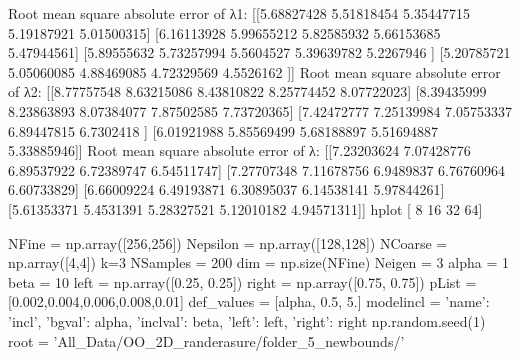 Root mean square absolute error of λ1:
 [[5.68827428 5.51818454 5.35447715 5.19187921 5.01500315]
 [6.16113928 5.99655212 5.82585932 5.66153685 5.47944561]
 [5.89555632 5.73257994 5.5604527  5.39639782 5.2267946 ]
 [5.20785721 5.05060085 4.88469085 4.72329569 4.5526162 ]]
Root mean square absolute error of λ2: 
 [[8.77757548 8.63215086 8.43810822 8.25774452 8.07722023]
 [8.39435999 8.23863893 8.07384077 7.87502585 7.73720365]
 [7.42472777 7.25139984 7.05753337 6.89447815 6.7302418 ]
 [6.01921988 5.85569499 5.68188897 5.51694887 5.33885946]]
Root mean square absolute error of λ: 
 [[7.23203624 7.07428776 6.89537922 6.72389747 6.54511747]
 [7.27707348 7.11678756 6.9489837  6.76760964 6.60733829]
 [6.66009224 6.49193871 6.30895037 6.14538141 5.97844261]
 [5.61353371 5.4531391  5.28327521 5.12010182 4.94571311]]
hplot [ 8 16 32 64]

NFine = np.array([256,256])
Nepsilon = np.array([128,128])
NCoarse = np.array([4,4])
k=3
NSamples = 200
dim = np.size(NFine)
Neigen = 3
alpha = 1
beta = 10
left = np.array([0.25, 0.25])
right = np.array([0.75, 0.75])
pList = [0.002,0.004,0.006,0.008,0.01]
def_values = [alpha, 0.5, 5.]
modelincl = {'name': 'incl', 'bgval': alpha, 'inclval': beta, 'left': left, 'right': right}
np.random.seed(1)
root = 'All_Data/OO_2D_randerasure/folder_5_newbounds/'